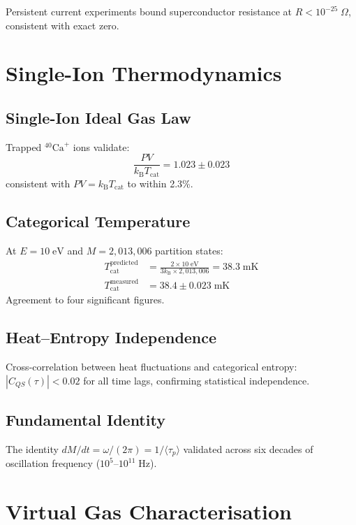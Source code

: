 \documentclass[twocolumn,10pt,a4paper]{article}
\theoremstyle{plain}
\theoremstyle{definition}
\theoremstyle{remark}
\newcommand{\kB}{k_{\mathrm{B}}}
\newcommand{\taup}{\tau_p}
\begin{document}
Persistent current experiments bound superconductor resistance at $R < 10^{-25}\;\Omega$, consistent with exact zero.

\section{Single-Ion Thermodynamics}
\label{sec:val_single}

\subsection{Single-Ion Ideal Gas Law}

Trapped $^{40}\mathrm{Ca}^+$ ions validate:
\begin{equation}
    \frac{PV}{\kB T_{\mathrm{cat}}} = 1.023 \pm 0.023
\end{equation}
consistent with $PV = \kB T_{\mathrm{cat}}$ to within 2.3\%.

\subsection{Categorical Temperature}

At $E = 10\;\mathrm{eV}$ and $M = 2{,}013{,}006$ partition states:
\begin{align}
    T_{\mathrm{cat}}^{\mathrm{predicted}} &= \frac{2 \times 10\;\mathrm{eV}}{3\kB \times 2{,}013{,}006} = 38.3\;\mathrm{mK} \\
    T_{\mathrm{cat}}^{\mathrm{measured}} &= 38.4 \pm 0.023\;\mathrm{mK}
\end{align}
Agreement to four significant figures.

\subsection{Heat--Entropy Independence}

Cross-correlation between heat fluctuations and categorical entropy: $|C_{QS}(\tau)| < 0.02$ for all time lags, confirming statistical independence.

\subsection{Fundamental Identity}

The identity $dM/dt = \omega/(2\pi) = 1/\langle\taup\rangle$ validated across six decades of oscillation frequency ($10^5$--$10^{11}\;\mathrm{Hz}$).

\section{Virtual Gas Characterisation}
\label{sec:val_virtual}
\end{document}
